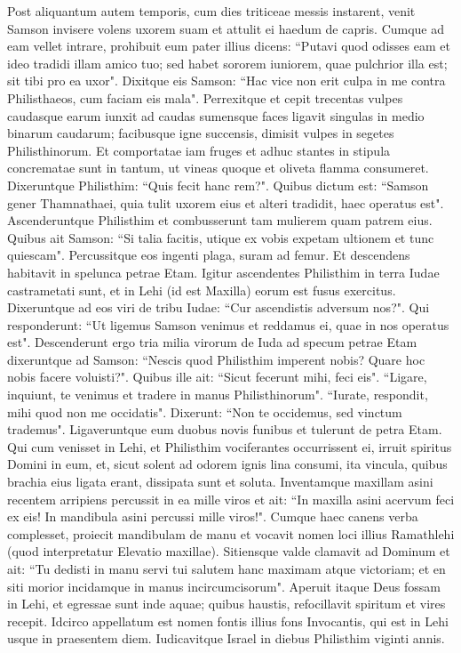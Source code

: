 \begin{biblechapter}  
\verse Post aliquantum autem temporis, cum dies triticeae messis instarent, venit Samson invisere volens uxorem suam et attulit ei haedum de capris. Cumque ad eam vellet intrare, prohibuit eum pater illius 
\verse dicens: “Putavi quod odisses eam et ideo tradidi illam amico tuo; sed habet sororem iuniorem, quae pulchrior illa est; sit tibi pro ea uxor". 
\verse Dixitque eis Samson: “Hac vice non erit culpa in me contra Philisthaeos, cum faciam eis mala". 
\verse Perrexitque et cepit trecentas vulpes caudasque earum iunxit ad caudas sumensque faces ligavit singulas in medio binarum caudarum; 
\verse facibusque igne succensis, dimisit vulpes in segetes Philisthinorum. Et comportatae iam fruges et adhuc stantes in stipula concrematae sunt in tantum, ut vineas quoque et oliveta flamma consumeret. 
\verse Dixeruntque Philisthim: “Quis fecit hanc rem?". Quibus dictum est: “Samson gener Thamnathaei, quia tulit uxorem eius et alteri tradidit, haec operatus est". Ascenderuntque Philisthim et combusserunt tam mulierem quam patrem eius. 
\verse Quibus ait Samson: “Si talia facitis, utique ex vobis expetam ultionem et tunc quiescam". 
\verse Percussitque eos ingenti plaga, suram ad femur. Et descendens habitavit in spelunca petrae Etam. 
\verse Igitur ascendentes Philisthim in terra Iudae castrametati sunt, et in Lehi (id est Maxilla) eorum est fusus exercitus. 
\verse Dixeruntque ad eos viri de tribu Iudae: “Cur ascendistis adversum nos?". Qui responderunt: “Ut ligemus Samson venimus et reddamus ei, quae in nos operatus est". 
\verse Descenderunt ergo tria milia virorum de Iuda ad specum petrae Etam dixeruntque ad Samson: “Nescis quod Philisthim imperent nobis? Quare hoc nobis facere voluisti?". Quibus ille ait: “Sicut fecerunt mihi, feci eis". 
\verse “Ligare, inquiunt, te venimus et tradere in manus Philisthinorum". “Iurate, respondit, mihi quod non me occidatis". 
\verse Dixerunt: “Non te occidemus, sed vinctum trademus". Ligaveruntque eum duobus novis funibus et tulerunt de petra Etam. 
\verse Qui cum venisset in Lehi, et Philisthim vociferantes occurrissent ei, irruit spiritus Domini in eum, et, sicut solent ad odorem ignis lina consumi, ita vincula, quibus brachia eius ligata erant, dissipata sunt et soluta. 
\verse Inventamque maxillam asini recentem arripiens percussit in ea mille viros  
\verse et ait: “In maxilla asini acervum feci ex eis! In mandibula asini percussi mille viros!". 
\verse Cumque haec canens verba complesset, proiecit mandibulam de manu et vocavit nomen loci illius Ramathlehi (quod interpretatur Elevatio maxillae). 
\verse Sitiensque valde clamavit ad Dominum et ait: “Tu dedisti in manu servi tui salutem hanc maximam atque victoriam; et en siti morior incidamque in manus incircumcisorum". 
\verse Aperuit itaque Deus fossam in Lehi, et egressae sunt inde aquae; quibus haustis, refocillavit spiritum et vires recepit. Idcirco appellatum est nomen fontis illius fons Invocantis, qui est in Lehi usque in praesentem diem. 
\verse Iudicavitque Israel in diebus Philisthim viginti annis. 
\end{biblechapter}

